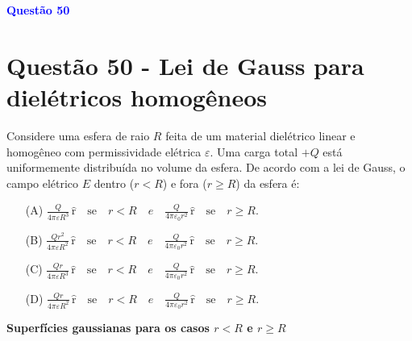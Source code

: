\documentclass[a4paper,12pt]{article}
\begin{document}
\begin{flushleft}
\textbf{\textcolor{blue}{\Large Quest\~ao 50}}\\
\noindent
\section{Quest\~ao 50 - Lei de Gauss para dielétricos homogêneos}
Considere uma esfera de raio \( R \) feita de um material dielétrico linear e homogêneo com permissividade elétrica \( \varepsilon \).  
Uma carga total \( +Q \) está uniformemente distribuída no volume da esfera. De acordo com a lei de Gauss, o campo elétrico \( E \) 
dentro (\( r < R \)) e fora (\( r \geq R \)) da esfera é:


\begin{itemize}
\item[(A)] $\frac{Q}{4\pi\varepsilon R^3} \, \hat{\textrm{r}} \quad \text{se} \quad r < R \quad e \quad \frac{Q}{4\pi\varepsilon_0 r^2} \, \hat{\textrm{r}} \quad \text{se} \quad r \geq R. $
\item[(B)] $\frac{Q r^2}{4\pi\varepsilon R^2} \, \hat{\textrm{r}} \quad \text{se} \quad r < R \quad e \quad \frac{Q}{4\pi\varepsilon_0 r^2} \, \hat{\textrm{r}}  \quad \text{se} \quad r \geq R.$
\item[(C)] $\frac{Q r}{4\pi\varepsilon R^3} \, \hat{\textrm{r}} \quad \text{se} \quad r < R \quad e \quad \frac{Q}{4\pi\varepsilon_0 r^2} \, \hat{\textrm{r}} \quad \text{se} \quad r \geq R.$
\item[(D)] $\frac{Q r}{4\pi\varepsilon R^2} \, \hat{\textrm{r}} \quad \text{se} \quad r < R \quad e \quad \frac{Q}{4\pi\varepsilon_0 r^2} \, \hat{\textrm{r}} \quad \text{se} \quad r \geq R.$
\end{itemize}

\vspace{0.5cm}

\begin{center}
\textbf{Superfícies gaussianas para os casos \(r<R\) e \(r\geq R\)}
\end{center}

\begin{center}
\end{center}
\end{flushleft}
\end{document}

